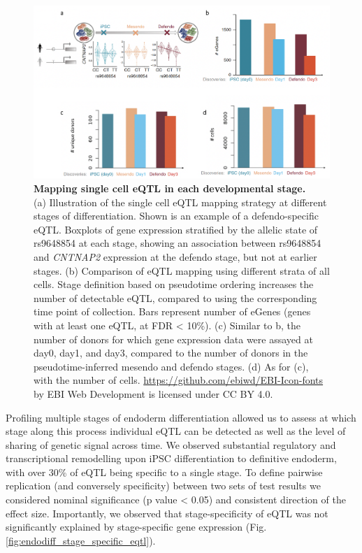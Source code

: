 \begin{figure}[h]
\centering
\includegraphics[width=14cm]{Chapter4/Fig/endodiff_eqtl.png}
\caption[eQTL maps of iPSC, mesendo, defendo]{\textbf{Mapping single cell eQTL in each developmental stage.}\\
(a) Illustration of the single cell eQTL mapping strategy at different stages of differentiation.
Shown is an example of a defendo-specific eQTL. 
Boxplots of gene expression stratified by the allelic state of
rs9648854 at each stage, showing an association between rs9648854 and \textit{CNTNAP2} expression at the defendo stage, but not at earlier stages. 
(b) Comparison of eQTL mapping using different strata of all cells.
Stage definition based on pseudotime ordering increases the number of detectable eQTL, compared to using the corresponding time point of collection.
Bars represent number of eGenes (genes with at least one eQTL, at FDR < 10\%).
(c) Similar to b, the number of donors for which gene expression data were assayed at day0, day1, and day3, compared to the number of donors in the pseudotime-inferred mesendo and defendo stages.
(d) As for (c), with the number of cells.
\url{https://github.com/ebiwd/EBI-Icon-fonts} by EBI Web Development is licensed under CC BY 4.0. }
\label{fig:endodiff_stage_eqtl}
\end{figure}

Profiling multiple stages of endoderm differentiation allowed us to assess at which stage along this process individual eQTL can be detected as well as the level of sharing of genetic signal across time. 
We observed substantial regulatory and transcriptional remodelling upon iPSC differentiation to definitive endoderm, with over 30\% of eQTL being specific to a single stage.
To define pairwise replication (and conversely specificity) between two sets of test results we considered nominal significance (p value < 0.05) and consistent direction of the effect size.
Importantly, we observed that stage-specificity of eQTL was not significantly explained by stage-specific gene expression (Fig. \ref{fig:endodiff_stage_specific_eqtl}).

